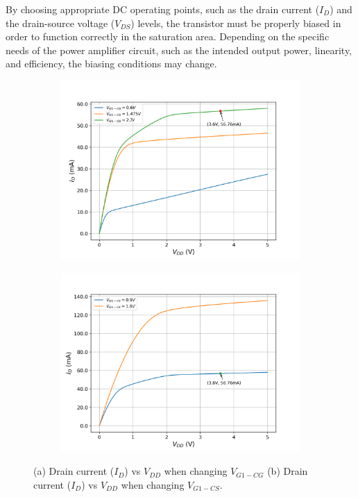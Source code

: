 By choosing appropriate DC operating points, such as the drain current ($I_D$) and the drain-source voltage ($V_{DS}$) levels, the transistor must be properly biased in order to function correctly in the saturation area. Depending on the specific needs of the power amplifier circuit, such as the intended output power, linearity, and efficiency, the biasing conditions may change.
 \begin{figure}[H]
  \centering
  \begin{subfigure}{0.49\textwidth}
    \centering
    \includegraphics[width=\linewidth]{figures/id-vs-vds-parametric-gs2.png}
    \caption{}
    \label{fig:id-vs-vdd-parametric-gs2}
  \end{subfigure}
  \hfill
  \begin{subfigure}{0.49\textwidth}
    \centering
    \includegraphics[width=\linewidth]{figures/id-vs-vds-parametric-gs1.png}
    \caption{}
     \label{fig:id-vs-vdd-parametric-gs1}
  \end{subfigure}
  \caption{(a) Drain current ($I_D$) vs $V_{DD}$ when changing $V_{G1-CG}$ (b)  Drain current ($I_D$) vs $V_{DD}$ when changing $V_{G1-CS}$.}
  \label{fig:id-vs-vdd-gs1-gs2}
\end{figure}

